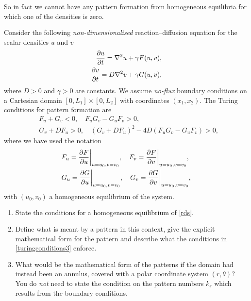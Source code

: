 \documentclass[a4paper, 12pt]{article}
\begin{document}
\begin{enumerate}[label={\bf \arabic{*}.\;}, ref={\arabic{*}},itemsep=3ex, left=0ex]
{\begin{enumerate}[label=(\alph*)]
{              So in fact we cannot have any pattern formation from homogeneous equilibria for which one of the densities is zero.
            }
        \end{enumerate}

      }


      {
        Consider the following \emph{non-dimensionalised} reaction--diffusion equation for the scalar densities $u$ and $v$
        \begin{subequations}
          \label{rds}
          \begin{align}
            \pd{u}{t} = \nabla^2 u + \gamma F(u,v),\\
            \pd{v}{t} = D \nabla^2 v + \gamma G(u,v),
          \end{align}
        \end{subequations}
        where $D>0$ and $\gamma>0$ are constants. We assume \emph{no-flux} boundary conditions on a Cartesian domain $[0,L_1]\times[0,L_2]$ with coordinates $(x_1,x_2)$. The Turing conditions for pattern formation are
        \begin{align}
          & F_u +G_v <0, \quad F_uG_v  -G_uF_v> 0,\nonumber \\
          & G_v + DF_u>0,\quad (G_v+ D F_u)^2 - 4 D (F_uG_v  -G_uF_v) >0, \label{turingconditions3}
        \end{align}
        where we have used the notation
        \begin{align*}
          &F_{u} = \pd{F}{u}\bigg\vert_{u=u_0,v=v_0},\quad F_{v} = \pd{F}{v}\bigg\vert_{u=u_0,v=v_0},\\
          &G_{u} = \pd{G}{u}\bigg\vert_{u=u_0,v=v_0},\quad G_{v} = \pd{G}{v}\bigg\vert_{u=u_0,v=v_0},
        \end{align*}
        with $(u_0,v_0)$ a homogeneous equilibrium of the system.
        \begin{enumerate}[label=(\alph*)]
          \item State the conditions for a homogeneous equilibrium of \cref{rds}.
          \item Define what is meant by a pattern in this context, give the explicit mathematical form for the pattern and describe what the conditions in \cref{turingconditions3} enforce.

          \item What would be the mathematical form of the patterns if the domain had instead been an annulus, covered with a polar coordinate system $(r,\theta)$? You do \emph{not} need to state the condition on the pattern numbers $k_s$ which results from the boundary conditions.


\end{enumerate}}
\end{enumerate}
\end{document}
